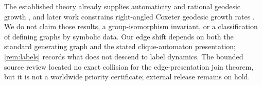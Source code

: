 \documentclass[11pt,a4paper]{amsart}
\theoremstyle{definition}
\theoremstyle{remark}
\begin{document}
The established theory already supplies automaticity and rational geodesic
growth \cite{BrinkHowlett1993,AntolinCiobanu2013}, and later work constrains
right-angled Coxeter geodesic growth rates \cite{KolpakovTalambutsa2020}.  We
do not claim those results, a group-isomorphism invariant, or a classification
of defining graphs by symbolic data.  Our edge shift depends on both the
standard generating graph and the stated clique-automaton presentation;
\cref{rem:labels} records what does not descend to label dynamics.  The
bounded source review located no exact collision for the edge-presentation
join theorem, but it is not a worldwide priority certificate; external
release remains on hold.



\end{document}
